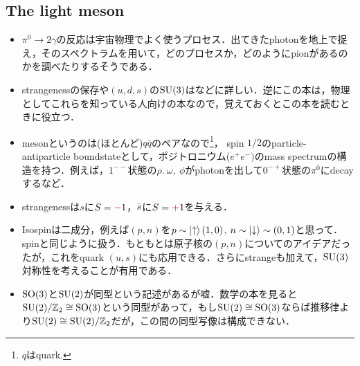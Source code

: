 \subsection{The light meson}
\begin{itemize}
		\item $\pi^0 \to 2\gamma $の反応は宇宙物理でよく使うプロセス．出てきたphotonを地上で捉え，そのスペクトラムを用いて，どのプロセスか，どのようにpionがあるのかを調べたりするそうである．
		\item strangenessの保存や$(u, d, s) $の$\mathrm{SU}(3) $は\cite{BB03663366}などに詳しい．逆にこの本は，物理としてこれらを知っている人向けの本なので，覚えておくとこの本を読むときに役立つ．
		\item mesonというのは(ほとんど)$q\bar{q} $のペアなので\footnote{$q $はquark.}，
				spin $1/2 $のparticle-antiparticle boundstateとして，ポジトロニウム($e^{+}e^{-})$のmass spectrumの構造を持つ．例えば，$1^{--} $状態の$\rho.\ \omega,\ \phi $がphotonを出して$0^{-+} $状態の$\pi^{0} $にdecayするなど．
		\item strangenessは$s $に$S=\color{red}{-}\color{black}{1}  $，$\textcolor{red}{\bar{\color{black}{s}}} $に$S = \color{red}{+}\color{black}{1} $を与える．
		\item Isospinは二成分，例えば$(p, n) $を$p \sim \ket{\uparrow}(1, 0) $, $n\sim \ket{\downarrow} \sim (0, 1)$と思って．spinと同じように扱う．もともとは原子核の$(p, n) $についてのアイデアだったが，これをquark $(u, s) $にも応用できる．さらにstrangeも加えて，$\mathrm{SU}(3) $対称性を考えることが有用である．
		\item $\mathrm{SO}(3) $と$\mathrm{SU}(2) $が同型という記述があるが嘘．数学の本を見ると$\mathrm{SU}(2)/\mathbb{Z}_2 \cong \mathrm{SO}(3)$という同型があって，もし$\mathrm{SU}(2) \cong \mathrm{SO}(3) $ならば推移律より$\mathrm{SU}(2) \cong\mathrm{SU}(2)/\mathbb{Z}_2 $だが，この間の同型写像は構成できない．

\end{itemize}
